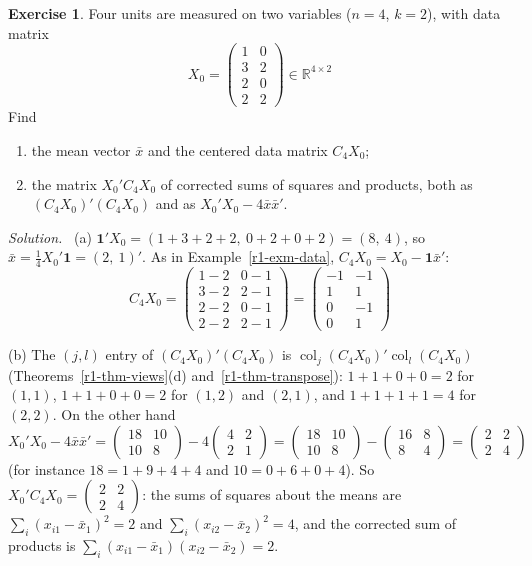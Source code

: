\documentclass[12pt]{article}
\newcommand{\R}{\mathbb R}
\newcommand{\one}{\mathbf 1}
\DeclareMathOperator{\col}{col}
\theoremstyle{definition}
\newtheorem{exercise}{Exercise}
\newenvironment{solution}{\par\noindent\textit{Solution.}\ }{\par\smallskip}
\begin{document}
\begin{exercise}\label{r1-ex-data-drill}
Four units are measured on two variables (\(n=4\), \(k=2\)), with data matrix
\[
X_0=\begin{pmatrix}1&0\\3&2\\2&0\\2&2\end{pmatrix}\in\R^{4\times2}
\]
Find
\begin{enumerate}
\item the mean vector \(\bar x\) and the centered data matrix \(C_4X_0\);
\item the matrix \(X_0'C_4X_0\) of corrected sums of squares and products, both as
\((C_4X_0)'(C_4X_0)\) and as \(X_0'X_0-4\bar x\bar x'\).
\end{enumerate}
\end{exercise}
\begin{solution}
(a) \(\one'X_0=(1+3+2+2,\ 0+2+0+2)=(8,\ 4)\), so \(\bar x=\frac14X_0'\one=(2,\ 1)'\). As in
Example~\ref{r1-exm-data}, \(C_4X_0=X_0-\one\bar x'\):
\[
C_4X_0=\begin{pmatrix}1-2&0-1\\3-2&2-1\\2-2&0-1\\2-2&2-1\end{pmatrix}
=\begin{pmatrix}-1&-1\\1&1\\0&-1\\0&1\end{pmatrix}
\]

(b) The \((j,l)\) entry of \((C_4X_0)'(C_4X_0)\) is \(\col_j(C_4X_0)'\col_l(C_4X_0)\)
(Theorems~\ref{r1-thm-views}(d) and~\ref{r1-thm-transpose}): \(1+1+0+0=2\) for \((1,1)\),
\(1+1+0+0=2\) for \((1,2)\) and \((2,1)\), and \(1+1+1+1=4\) for \((2,2)\). On the other hand
\[
X_0'X_0-4\bar x\bar x'=\begin{pmatrix}18&10\\10&8\end{pmatrix}-4\begin{pmatrix}4&2\\2&1\end{pmatrix}
=\begin{pmatrix}18&10\\10&8\end{pmatrix}-\begin{pmatrix}16&8\\8&4\end{pmatrix}
=\begin{pmatrix}2&2\\2&4\end{pmatrix}
\]
(for instance \(18=1+9+4+4\) and \(10=0+6+0+4\)). So
\(X_0'C_4X_0=\left(\begin{smallmatrix}2&2\\2&4\end{smallmatrix}\right)\): the sums of squares
about the means are \(\sum_i(x_{i1}-\bar x_1)^2=2\) and \(\sum_i(x_{i2}-\bar x_2)^2=4\), and the
corrected sum of products is \(\sum_i(x_{i1}-\bar x_1)(x_{i2}-\bar x_2)=2\).
\end{solution}
\end{document}
